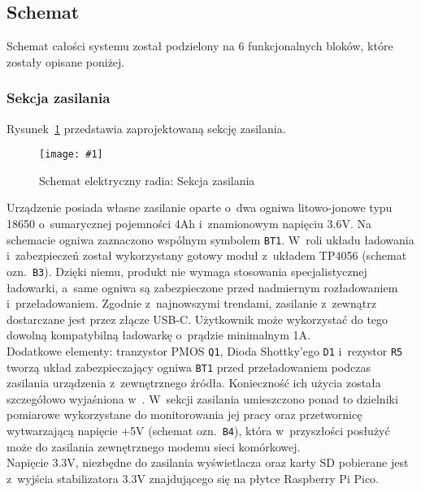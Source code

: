 \documentclass[polish]{aghengthesis}
\newcommand{\imgint}[4]{
	\begin{figure}[{#4}]
		\centering
		\texttt{[image: \#1]}
		\caption{#2}
		\label{#1}
	\end{figure}
}
\newcommand{\imgh}[3]{\imgint{#1}{#2}{#3}{H}}
\begin{document}
		\subsection{Schemat}

			Schemat całości systemu został podzielony na 6 funkcjonalnych bloków, które zostały opisane poniżej.
			
			\subsubsection{Sekcja zasilania}
				Rysunek~\ref{3/hw_kicad_sch_power} przedstawia zaprojektowaną sekcję zasilania.
				\imgh{3/hw_kicad_sch_power}{Schemat elektryczny radia: Sekcja zasilania}{0.95}
				
				Urządzenie posiada własne zasilanie oparte o~dwa ogniwa litowo-jonowe typu 18650 o~sumarycznej pojemności 4Ah i~znamionowym napięciu 3.6V. Na schemacie ogniwa zaznaczono wspólnym symbolem \lstinline|BT1|. W~roli układu ładowania i~zabezpieczeń został wykorzystany gotowy moduł z~układem TP4056\textsuperscript{\cite{hw_chg}} (schemat ozn.~\lstinline|B3|). Dzięki niemu, produkt nie wymaga stosowania specjalistycznej ładowarki, a~same ogniwa są zabezpieczone przed nadmiernym rozładowaniem i~przeładowaniem. Zgodnie z~najnowszymi trendami, zasilanie z~zewnątrz dostarczane jest przez złącze USB-C. Użytkownik może wykorzystać do tego dowolną kompatybilną ładowarkę o~prądzie minimalnym 1A.
				$ $\\
				
				Dodatkowe elementy: tranzystor PMOS \lstinline|Q1|, Dioda Shottky'ego \lstinline|D1| i~rezystor \lstinline|R5| tworzą układ zabezpieczający ogniwa \lstinline|BT1| przed przeładowaniem podczas  zasilania urządzenia z~zewnętrznego źródła. Konieczność ich użycia została szczegółowo wyjaśniona w~\cite{hw_load_sw}. W~sekcji zasilania umieszczono ponad to dzielniki pomiarowe wykorzystane do monitorowania jej pracy oraz przetwornicę wytwarzającą napięcie +5V (schemat ozn.~\lstinline|B4|), która w~przyszłości posłużyć może do zasilania zewnętrznego modemu sieci komórkowej.
				$ $\\
				
				Napięcie 3.3V, niezbędne do zasilania wyświetlacza oraz karty SD pobierane jest z~wyjścia stabilizatora 3.3V znajdującego się na płytce Raspberry Pi Pico.
				
\end{document}
